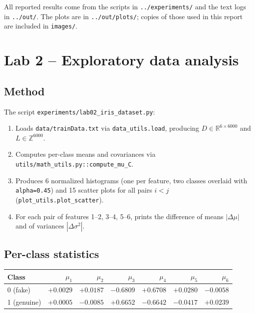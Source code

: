 \documentclass[11pt,a4paper]{article}
\begin{document}
\bigskip
All reported results come from the scripts in \texttt{../experiments/}
and the text logs in \texttt{../out/}. The plots are in
\texttt{../out/plots/}; copies of those used in this report are
included in \texttt{images/}.

\section{Lab 2 -- Exploratory data analysis}\label{sec:lab2}

\subsection{Method}

The script \texttt{experiments/lab02\_iris\_dataset.py}:

\begin{enumerate}
\item Loads \texttt{data/trainData.txt} via \texttt{data\_utils.load},
      producing $D \in \mathbb{R}^{6 \times 6000}$ and
      $L \in \mathbb{Z}^{6000}$.
\item Computes per-class means and covariances via
      \texttt{utils/math\_utils.py::compute\_mu\_C}.
\item Produces 6 normalized histograms (one per feature, two classes
      overlaid with \texttt{alpha=0.45}) and 15 scatter plots for all
      pairs $i<j$ (\texttt{plot\_utils.plot\_scatter}).
\item For each pair of features 1--2, 3--4, 5--6, prints the
      difference of means $|\Delta\mu|$ and of variances
      $|\Delta\sigma^2|$.
\end{enumerate}

\subsection{Per-class statistics}

\begin{table}[H]
\centering
\small
\begin{tabular}{lrrrrrr}
\toprule
Class         & $\mu_1$  & $\mu_2$  & $\mu_3$           & $\mu_4$          & $\mu_5$  & $\mu_6$ \\
\midrule
0 (fake)      & $+0.0029$ & $+0.0187$ & $\mathbf{-0.6809}$ & $\mathbf{+0.6708}$ & $+0.0280$ & $-0.0058$ \\
1 (genuine)   & $+0.0005$ & $-0.0085$ & $\mathbf{+0.6652}$ & $\mathbf{-0.6642}$ & $-0.0417$ & $+0.0239$ \\
\bottomrule
\end{tabular}
\end{table}
\end{document}
